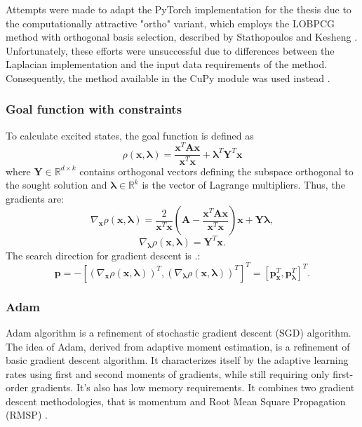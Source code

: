 Attempts were made to adapt the PyTorch implementation \cite{torch_lobpcg} for the thesis due to the computationally attractive "ortho" variant, which employs the LOBPCG method with orthogonal basis selection, described by Stathopoulos and Kesheng \cite{stathopoulous2002}. Unfortunately, these efforts were unsuccessful due to differences between the Laplacian implementation and the input data requirements of the method. Consequently, the method available in the CuPy module was used instead \cite{cupy_lobpcg}.

\subsubsection{Goal function with constraints}

To calculate excited states, the goal function is defined as
\begin{equation}
	\rho\left(\mathbf{x}, \bm{\lambda} \right) = \frac{\mathbf{x}^T\mathbf{A}\mathbf{x}}{\mathbf{x}^T\mathbf{x}} + \bm{\lambda}^T \mathbf{Y}^T \mathbf{x}
\end{equation}
\noindent where $\mathbf{Y}\in\mathbb{R}^{d \times k}$ contains orthogonal vectors defining the subspace orthogonal to the sought solution and $\bm{\lambda}\in\mathbb{R}^k$ is the vector of Lagrange multipliers. Thus, the gradients are:
\begin{equation}
	\nabla_{\mathbf{x}}\rho\left(\mathbf{x},\bm{\lambda}\right) = \frac{2}{\mathbf{x}^T\mathbf{x}}\left(\mathbf{A}-\frac{\mathbf{x}^T\mathbf{A}\mathbf{x}}{\mathbf{x}^T\mathbf{x}}\right)\mathbf{x} + \mathbf{Y}\bm{\lambda},
\end{equation}
\begin{equation}
	\nabla_{\bm{\lambda}}\rho\left(\mathbf{x},\bm{\lambda}\right) = \mathbf{Y}^T\mathbf{x}.
\end{equation}
The search direction for gradient descent is \cite{Kuropatwinski}.:
\begin{equation}
	\mathbf{p}=-\left[\left(\nabla_{\mathbf{x}}\rho\left(\mathbf{x},\bm{\lambda}\right)\right)^T, \left(\nabla_{\bm{\lambda}}\rho\left(\mathbf{x},\bm{\lambda}\right)\right)^T\right]^T = \left[\mathbf{p}_{\mathbf{x}}^T,\mathbf{p}_{\bm{\lambda}}^T\right]^T.
\end{equation}


\subsubsection{Adam}

Adam algorithm is a refinement of stochastic gradient descent (SGD) algorithm. The idea of
Adam, derived from adaptive moment estimation, is a refinement of basic gradient descent algorithm. It characterizes itself by the adaptive learning rates using first and second moments of gradients, while still requiring only first-order gradients. It's also has low memory requirements. It combines two gradient descent methodologies, that is momentum and Root Mean Square Propagation (RMSP) \cite{adam_geeks}.

